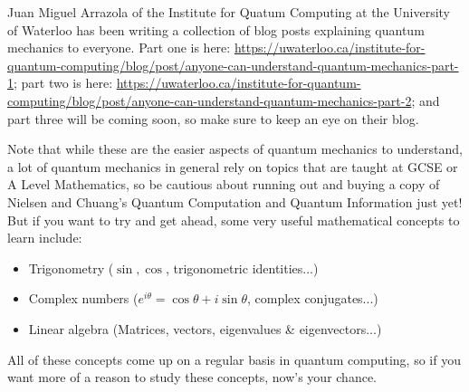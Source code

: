 \documentclass[twocolumn]{article}
\begin{document}
Juan Miguel Arrazola of the Institute for Quatum Computing at the University of Waterloo has been writing a collection of blog posts explaining quantum mechanics to everyone. Part one is here: \url{https://uwaterloo.ca/institute-for-quantum-computing/blog/post/anyone-can-understand-quantum-mechanics-part-1}; part two is here: \url{https://uwaterloo.ca/institute-for-quantum-computing/blog/post/anyone-can-understand-quantum-mechanics-part-2}; and part three will be coming soon, so make sure to keep an eye on their blog.

Note that while these are the easier aspects of quantum mechanics to understand, a lot of quantum mechanics in general rely on topics that are taught at GCSE or A Level Mathematics, so be cautious about running out and buying a copy of Nielsen and Chuang's Quantum Computation and Quantum Information just yet! But if you want to try and get ahead, some very useful mathematical concepts to learn include:

\begin{itemize}
\item Trigonometry ($\sin, \cos$, trigonometric identities...)
\item Complex numbers ($e^{i\theta} = \cos\theta + i\sin\theta$, complex conjugates...)
\item Linear algebra (Matrices, vectors, eigenvalues \& eigenvectors...)
\end{itemize}

All of these concepts come up on a regular basis in quantum computing, so if you want more of a reason to study these concepts, now's your chance.
\end{document}
